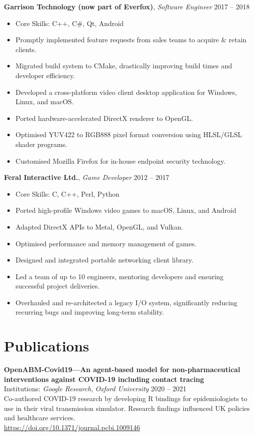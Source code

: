 \documentclass[a4paper,10pt]{article}
\newcommand{\coreskills}[1]{\item Core Skills: #1}
\begin{document}
{\begin{minipage}[t]{0.72\textwidth}
    \textbf{Garrison Technology (now part of Everfox)}, \textit{Software Engineer} \hfill 2017 -- 2018
    \begin{itemize}[leftmargin=1.5em, nosep]
        \coreskills{C++, C\#, Qt, Android}
        \item Promptly implemented feature requests from sales teams to acquire \& retain clients.
        \item Migrated build system to CMake, drastically improving build times and developer efficiency.
        \item Developed a cross-platform video client desktop application for  Windows, Linux, and macOS.
        \item Ported hardware-accelerated DirectX renderer to OpenGL.
        \item Optimised YUV422 to RGB888 pixel format conversion using HLSL/GLSL shader programs.
        \item Customised Mozilla Firefox for in-house endpoint security technology.
    \end{itemize}
    \vspace{0.5em}

    \textbf{Feral Interactive Ltd.}, \textit{Game Developer} \hfill 2012 -- 2017
    \begin{itemize}[leftmargin=1.5em, nosep]
        \coreskills{C, C++, Perl, Python}
        \item Ported high-profile Windows video games to macOS, Linux, and Android
        \item Adapted DirectX APIs to Metal, OpenGL, and Vulkan.
        \item Optimised performance and memory management of games.
        \item Designed and integrated portable networking client library.
        \item Led a team of up to 10 engineers, mentoring developers and ensuring successful project deliveries.
        \item Overhauled and re-architected a legacy I/O system, significantly reducing recurring bugs and improving long-term stability.
    \end{itemize}

    \section*{\color{navy} Publications}
    \textbf{OpenABM-Covid19—An agent-based model for non-pharmaceutical interventions against COVID-19 including contact tracing}\\
    Institutions: \textit{Google Research}, \textit{Oxford University} \hfill 2020 -- 2021\\[1.0em]
    Co-authored COVID-19 research by developing R bindings for epidemiologists to use in their viral transmission simulator. Research findings influenced UK policies and healthcare services.\\
    \href{https://doi.org/10.1371/journal.pcbi.1009146}{https://doi.org/10.1371/journal.pcbi.1009146}
\end{minipage}%
\vfill %
}%
\end{document}
